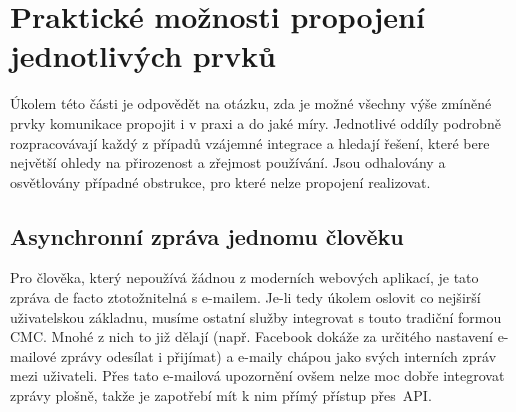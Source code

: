 \documentclass[12pt,oneside,final]{fithesis2}
\begin{document}
\section{Praktické možnosti propojení jednotlivých prvků}\label{practicalOptions}
Úkolem této části je odpovědět na otázku, zda je možné všechny výše zmíněné prvky komunikace propojit i v praxi a do jaké míry. Jednotlivé oddíly podrobně rozpracovávají každý z případů vzájemné integrace a hledají řešení, které bere největší ohledy na přirozenost a zřejmost používání. Jsou odhalovány a osvětlovány případné obstrukce, pro které nelze propojení realizovat.

\subsection{Asynchronní zpráva jednomu člověku}
Pro člověka, který nepoužívá žádnou z moderních webových aplikací, je tato zpráva de facto ztotožnitelná s e-mailem. Je-li tedy úkolem oslovit co nejširší uživatelskou základnu, musíme ostatní služby integrovat s touto tradiční formou CMC. Mnohé z nich to již dělají (např. Facebook dokáže za určitého nastavení e-mailové zprávy odesílat i přijímat) a e-maily chápou jako  svých interních zpráv mezi uživateli. Přes tato e-mailová upozornění ovšem nelze moc dobře integrovat zprávy plošně, takže je zapotřebí mít k nim přímý přístup přes~API.
\end{document}
